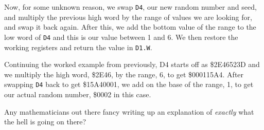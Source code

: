 Now, for some unknown reason, we swap \lstinline!D4!, our new random
number and seed, and multiply the previous high word by the range
of values we are looking for, and swap it back again. After this,
we add the bottom value of the range to the low word of \lstinline!D4!
and this is our value between 1 and 6. We then restore the working
registers and return the value in \lstinline!D1.W!.

Continuing the worked example from previously, D4 starts off as \$2E46523D
and we multiply the high word, \$2E46, by the range, 6, to get \$000115A4.
After swapping \lstinline!D4! back to get \$15A40001, we add on the
base of the range, 1, to get our actual random number, \$0002 in this
case.

Any mathematicians out there fancy writing up an explanation of \emph{exactly}
what the hell is going on there?
